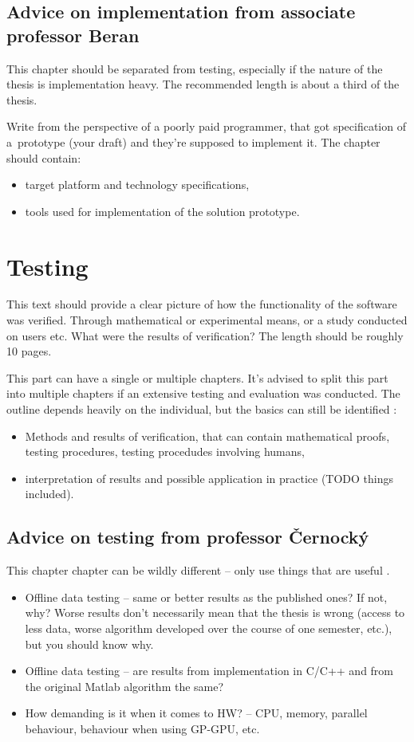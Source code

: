 \subsection{Advice on implementation from associate professor Beran}

This chapter should be separated from testing, especially if the nature of the thesis is implementation heavy. The recommended length is about a third of the thesis.

Write from the perspective of a poorly paid programmer, that got specification of a~prototype (your draft) and they're supposed to implement it. The chapter should contain:
\begin{itemize}
  \item{target platform and technology specifications,}
  \item{tools used for implementation of the solution prototype.}
\end{itemize}


\section{Testing}
\label{testovani}

This text should provide a clear picture of how the functionality of the software was verified. Through mathematical or experimental means, or a study conducted on users etc. What were the results of verification? The length should be roughly 10 pages.

This part can have a single or multiple chapters. It's advised to split this part into multiple chapters if an extensive testing and evaluation was conducted. The outline depends heavily on the individual, but the basics can still be identified \cite{Zemcik}: 
\begin{itemize}
  \item{Methods and results of verification, that can contain mathematical proofs, testing procedures, testing procedudes involving humans,}
  \item{interpretation of results and possible application in practice (TODO things included).}
\end{itemize}

\subsection{Advice on testing from professor Černocký}

This chapter chapter can be wildly different -- only use things that are useful \cite{Cernocky}.
\begin{itemize}
  \item{Offline data testing -- same or better results as the published ones? If not, why? Worse results don't necessarily mean that the thesis is wrong (access to less data, worse algorithm developed over the course of one semester, etc.), but you should know why.}
  \item{Offline data testing -- are results from implementation in C/C++ and from the original Matlab algorithm the same?}
  \item{How demanding is it when it comes to HW? -- CPU, memory, parallel behaviour, behaviour when using GP-GPU, etc.}
\end{itemize}

